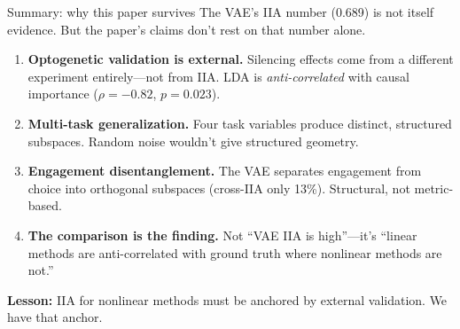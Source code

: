 \documentclass[aspectratio=169,11pt]{beamer}
\begin{document}
\begin{frame}{Summary: why this paper survives}
\vspace{-0.3em}
The VAE's IIA number (0.689) is not itself evidence. But the paper's claims don't rest on that number alone.
\vspace{0.3em}
\begin{enumerate}
  \item \textbf{Optogenetic validation is external.} Silencing effects come from a different experiment entirely---not from IIA. LDA is \emph{anti-correlated} with causal importance ($\rho = -0.82$, $p = 0.023$).
  \item \textbf{Multi-task generalization.} Four task variables produce distinct, structured subspaces. Random noise wouldn't give structured geometry.
  \item \textbf{Engagement disentanglement.} The VAE separates engagement from choice into orthogonal subspaces (cross-IIA only 13\%). Structural, not metric-based.
  \item \textbf{The comparison is the finding.} Not ``VAE IIA is high''---it's ``linear methods are anti-correlated with ground truth where nonlinear methods are not.''
\end{enumerate}
\vspace{0.3em}
\textbf{Lesson:} IIA for nonlinear methods must be anchored by external validation. We have that anchor.
\end{frame}
\end{document}
